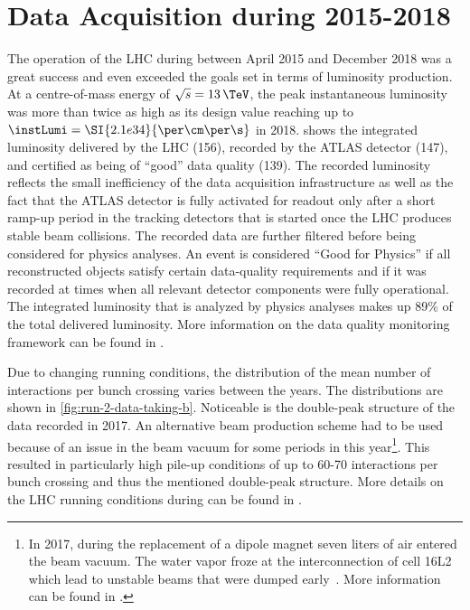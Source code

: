 \section{Data Acquisition during 2015-2018}
\label{sec:run-2-data-taking}


The operation of the LHC during \RunTwo between April 2015 and December 2018 was a great success and even exceeded the goals set in terms of luminosity production. At a centre-of-mass energy of $\sqrt{s} = 13\,\TeV$, the peak instantaneous luminosity was more than twice as high as its design value reaching up to $\instLumi = \SI{2.1e34}{\per\cm\per\s}$ in 2018.
 shows the integrated luminosity delivered by the LHC (156\ifb), recorded by the ATLAS detector (147\ifb), and certified as being of ``good'' data quality (139\ifb).
The recorded luminosity reflects the small inefficiency of the data acquisition infrastructure as well as the fact that the ATLAS detector is fully activated for readout only after a short ramp-up period in the tracking detectors that is started once the LHC produces stable beam collisions.
The recorded data are further filtered before being considered for physics analyses.
An event is considered ``Good for Physics'' if all reconstructed objects satisfy certain data-quality requirements and if it was recorded at times when all relevant detector components were fully operational.
The integrated luminosity that is analyzed by physics analyses makes up 89\% of the total delivered luminosity.
More information on the data quality monitoring framework can be found in .

Due to changing running conditions, the distribution of the mean number of interactions per bunch crossing varies between the years.
The distributions are shown in \cref{fig:run-2-data-taking-b}.
Noticeable is the double-peak structure of the data recorded in 2017.
An alternative beam production scheme had to be used because of an issue in the beam vacuum for some periods in this year\footnote{In 2017, during the replacement of a dipole magnet seven liters of air entered the beam vacuum. The water vapor froze at the interconnection of cell 16L2 which lead to unstable beams that were dumped early~\cite{Jimenez:2646067,Salvant:2646056}. More information can be found in .}. This resulted in particularly high pile-up conditions of up to 60-70 interactions per bunch crossing and thus the mentioned double-peak structure.
More details on the LHC running conditions during \RunTwo can be found in .

